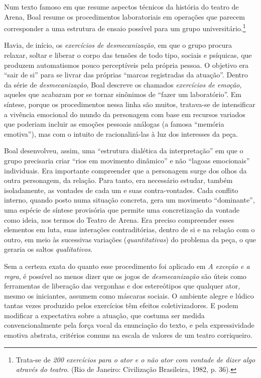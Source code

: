 Num texto famoso em que resume aspectos técnicos da história do teatro
de Arena, Boal resume os procedimentos laboratoriais em operações que
parecem corresponder a uma estrutura de ensaio possível para um grupo
universitário.\footnote{Trata-se de \textit{200 exercícios para o ator e o
  não ator com vontade de dizer algo através do teatro}. (Rio de
  Janeiro: Civilização Brasileira, 1982, p. 36).}

Havia, de início, os \textit{exercícios de desmecanização}, em que o grupo
procura relaxar, soltar e liberar o corpo das tensões de todo tipo,
sociais e psíquicas, que produzem automatismos pouco perceptíveis pela
própria pessoa. O objetivo era “sair de si” para se livrar das próprias
“marcas registradas da atuação”. Dentro da série de
\textit{desmecanização}, Boal descreve os chamados \textit{exercícios de
emoção,} aqueles que acabaram por se tornar sinônimos de “fazer um
laboratório”. Em síntese, porque os procedimentos nessa linha são
muitos, tratava-se de intensificar a vivência emocional do mundo da
personagem com base em recursos variados que poderiam incluir as emoções
pessoais análogas (a famosa “memória emotiva”), mas com o intuito de
racionalizá-las à luz dos interesses da peça.

Boal desenvolveu, assim, uma “estrutura dialética da interpretação” em
que o grupo precisaria criar “rios em movimento dinâmico” e não “lagoas
emocionais” individuais. Era importante compreender que a personagem
surge dos olhos da outra personagem, da relação. Para tanto, era
necessário estudar, também isoladamente, as vontades de cada um e suas
contra-vontades. Cada conflito interno, quando posto numa situação
concreta, gera um movimento “dominante”, uma espécie de síntese
provisória que permite uma concretização da vontade como ideia, nos
termos do Teatro de Arena. Era preciso compreender esses elementos em
luta, suas interações contraditórias, dentro de si e na relação com o
outro, em meio às sucessivas variações (\textit{quantitativas}) do problema
da peça, o que geraria os saltos \textit{qualitativos}.

Sem a certeza exata do quanto esse procedimento foi aplicado em \textit{A
exceção e a regra}, é possível ao menos dizer que os jogos de
\textit{desmecanização} são úteis como ferramentas de liberação das
vergonhas e dos estereótipos que qualquer ator, mesmo os iniciantes,
assumem como máscaras sociais. O ambiente alegre e lúdico tantas vezes
produzido pelos exercícios têm efeitos coletivizadores. E podem
modificar a expectativa sobre a atuação, que costuma ser medida
convencionalmente pela força vocal da enunciação do texto, e pela
expressividade emotiva abstrata, critérios comuns na escala de valores
de um teatro corriqueiro.

